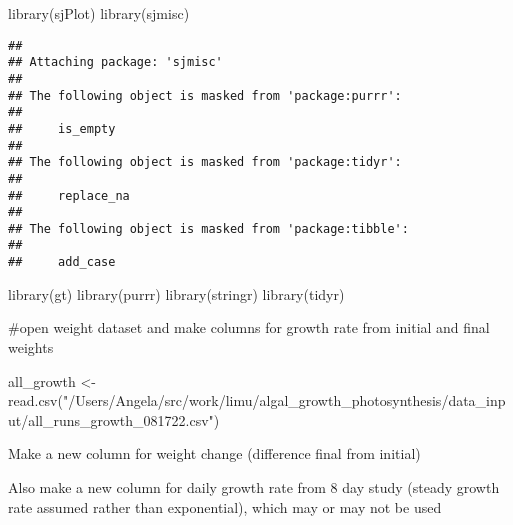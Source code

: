 \documentclass[
]{article}
\newenvironment{Shaded}{\begin{snugshade}}{\end{snugshade}}
\newcommand{\DecValTok}[1]{\textcolor[rgb]{0.00,0.00,0.81}{#1}}
\newcommand{\FunctionTok}[1]{\textcolor[rgb]{0.00,0.00,0.00}{#1}}
\newcommand{\NormalTok}[1]{#1}
\newcommand{\OtherTok}[1]{\textcolor[rgb]{0.56,0.35,0.01}{#1}}
\newcommand{\SpecialCharTok}[1]{\textcolor[rgb]{0.00,0.00,0.00}{#1}}
\newcommand{\StringTok}[1]{\textcolor[rgb]{0.31,0.60,0.02}{#1}}
\begin{document}
\begin{Shaded}
\begin{Highlighting}[]
\FunctionTok{library}\NormalTok{(sjPlot)}
\FunctionTok{library}\NormalTok{(sjmisc)}
\end{Highlighting}
\end{Shaded}

\begin{verbatim}
## 
## Attaching package: 'sjmisc'
## 
## The following object is masked from 'package:purrr':
## 
##     is_empty
## 
## The following object is masked from 'package:tidyr':
## 
##     replace_na
## 
## The following object is masked from 'package:tibble':
## 
##     add_case
\end{verbatim}

\begin{Shaded}
\begin{Highlighting}[]
\FunctionTok{library}\NormalTok{(gt)}
\FunctionTok{library}\NormalTok{(purrr)}
\FunctionTok{library}\NormalTok{(stringr)}
\FunctionTok{library}\NormalTok{(tidyr)}
\end{Highlighting}
\end{Shaded}

\#open weight dataset and make columns for growth rate from initial and
final weights

\begin{Shaded}
\begin{Highlighting}[]
\NormalTok{all\_growth }\OtherTok{\textless{}{-}} \FunctionTok{read.csv}\NormalTok{(}\StringTok{"/Users/Angela/src/work/limu/algal\_growth\_photosynthesis/data\_input/all\_runs\_growth\_081722.csv"}\NormalTok{)}
\end{Highlighting}
\end{Shaded}

Make a new column for weight change (difference final from initial)

\begin{Shaded}
\end{Shaded}

Also make a new column for daily growth rate from 8 day study (steady
growth rate assumed rather than exponential), which may or may not be
used
\end{document}
